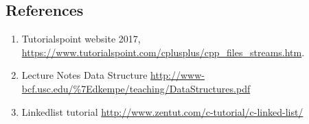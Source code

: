 \documentclass{article}
\begin{document}
\subsection*{References}
\begin{enumerate}
\item Tutorialspoint website 2017, 
\url{https://www.tutorialspoint.com/cplusplus/cpp_files_streams.htm}.
\item Lecture Notes Data Structure \url{http://www-bcf.usc.edu/\%7Edkempe/teaching/DataStructures.pdf}
\item Linkedlist tutorial \url{http://www.zentut.com/c-tutorial/c-linked-list/}
\end{enumerate}
\end{document}
